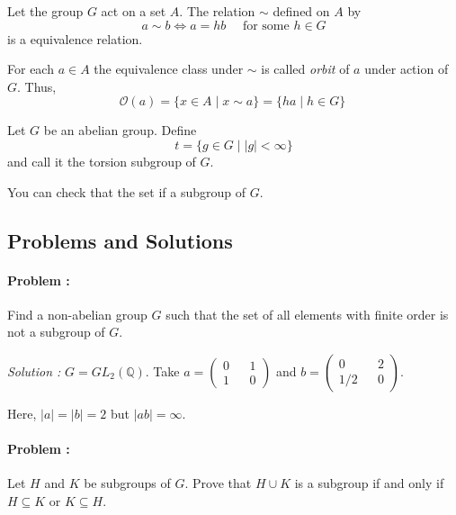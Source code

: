 \begin{proposition}
    Let the group $G$ act on a set $A$.             
    The relation $\sim$ defined on $A$ by 
    \[ a \sim b \iff a = hb \quad \text{ for some } h \in G\]
    is a equivalence relation.
\end{proposition}

\begin{definition}
    For each $a \in A$ the equivalence class under $\sim$ is called
    \textit{orbit} of $a$ under action of $G$. Thus,
    \[ \mathcal{O}(a) = \{ x \in A \mid x \sim a \} = \{ ha \mid h \in G \}\ \]
\end{definition}

\begin{definition}
    Let $G$ be an abelian group. Define
    \[ t=\{ g \in G \mid |g| < \infty \} \]
    and call it the torsion subgroup of $G$.
\end{definition}

You can check that the set if a subgroup of $G$.

\eject

\subsection*{Problems and Solutions}

\paragraph{Problem :} Find a non-abelian group $G$ such that the set of all elements with finite order is not a subgroup of $G$.

\vspace{4mm}
\textit{Solution :} $G=GL_2({\mathbb{Q}})$.
Take $a=\begin{pmatrix}
    0 && 1 \\
    1 && 0 
\end{pmatrix}$ 
and 
$b = \begin{pmatrix}
    0 && 2 \\
    1/2 && 0
\end{pmatrix}$.

Here, $|a|=|b|=2$ but $|ab|=\infty$.


\paragraph{Problem :} Let $H$ and $K$ be subgroups of $G$. Prove that $H \cup K$ is a subgroup if and only if $H \subseteq K$ or 
$K \subseteq H$.

